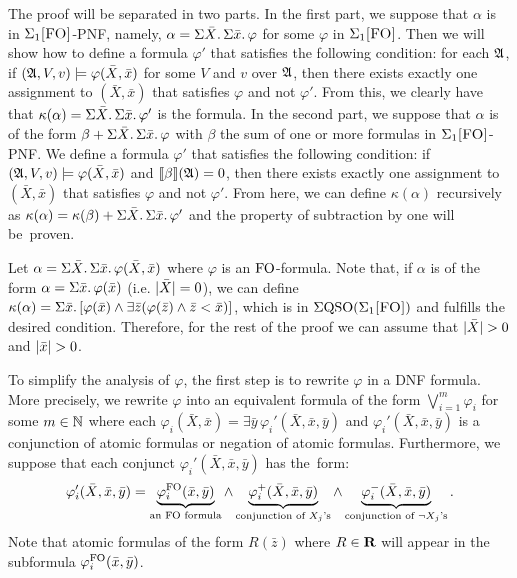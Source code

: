 The proof will be separated in two parts. In the first part, we suppose that  $\alpha$ is in $\Sigma_{1}\textsc{[FO]}$-PNF, namely, $\alpha = \Sigma{\bar{X}}.\,\Sigma{\bar{x}}.\,\varphi$ for some $\varphi$ in $\Sigma_{1}\textsc{[FO]}$. Then we will show how to define a formula $\varphi'$ that satisfies the following condition: for each $\mathfrak{A}$, if $(\mathfrak{A},V,v)\models \varphi(\bar{X},\bar{x})$ for some $V$ and $v$ over $\mathfrak{A}$, then there exists exactly one assignment to $(\bar{X},\bar{x})$ that satisfies $\varphi$ and not $\varphi'$. 
From this, we clearly have that $\kappa(\alpha) = \Sigma{\bar{X}}.\,\Sigma{\bar{x}}.\,\varphi'$ is the formula. In the second part, we suppose that $\alpha$ is of the form $\beta + \Sigma{\bar{X}}.\,\Sigma{\bar{x}}.\,\varphi$ with $\beta$ the sum of one or more formulas in $\Sigma_{1}\textsc{[FO]}$-PNF. 
We define a formula $\varphi'$ that satisfies the following condition: if $(\mathfrak{A},V,v)\models \varphi(\bar{X},\bar{x})$ and ${\llbracket{}{\beta}\rrbracket}(\mathfrak{A}) = 0$, then there exists exactly one assignment to $(\bar{X},\bar{x})$ that satisfies $\varphi$ and not $\varphi'$. From here, we can define $\kappa(\alpha)$ recursively as  $\kappa(\alpha) = \kappa(\beta) +  \Sigma{\bar{X}}.\,\Sigma{\bar{x}}.\,\varphi'$ and the property of subtraction by one will be~proven.

\vspace{1em}

  Let $\alpha =  \Sigma{\bar{X}}.\,\Sigma{\bar{x}}.\, \varphi(\bar{X},\bar{x})$ where $\varphi$ is an  ${\rm FO}$-formula.
Note that, if $\alpha$ is of the form $\alpha = \Sigma{\bar{x}}.\, \varphi(\bar{x})$ (i.e. $\vert \bar{X} \vert = 0$), we can define $\kappa(\alpha) = \Sigma{\bar{x}}.\, [\varphi(\bar{x})\wedge\exists\bar{z}(\varphi(\bar{z})\wedge\bar{z} < \bar{x})]$, which is in $\Sigma{\rm QSO}(\Sigma_{1}\textsc{[FO]})$ and fulfills the desired condition. 
Therefore, for the rest of the proof we can assume that $\vert \bar{X} \vert > 0$ and $\vert \bar{x} \vert > 0$.

To simplify the analysis of $\varphi$, the first step is to rewrite $\varphi$ in a DNF formula. 
More precisely, we rewrite $\varphi$ into an equivalent formula of the form $\bigvee_{i = 1}^m \varphi_i$ for some $m\in \mathbb{N}$ where each $\varphi_i(\bar{X}, \bar{x}) = \exists \bar{y} \, \varphi_i'(\bar{X}, \bar{x}, \bar{y})$ and $\varphi_i'(\bar{X}, \bar{x}, \bar{y})$ is a conjunction of atomic formulas or negation of atomic formulas. Furthermore, we suppose that each conjunct $\varphi_i'(\bar{X}, \bar{x}, \bar{y})$ has the~form:
$$
\varphi_i'(\bar{X}, \bar{x}, \bar{y}) =  \underbrace{\varphi_i^{{\rm FO}}(\bar{x},\bar{y})}_{\text{an ${\rm FO}$ formula}} \wedge 
\underbrace{\varphi_i^{+}(\bar{X},\bar{x},\bar{y})}_{\text{conjunction of $X_j$'s}} \wedge
\underbrace{\varphi_i^{-}(\bar{X},\bar{x},\bar{y})}_{\text{conjunction of $\neg X_j$'s}}.
$$
Note that atomic formulas of the form $R(\bar{z})$ where $R \in \mathbf{R}$ will appear in the subformula $\varphi_i^{{\rm FO}}(\bar{x},\bar{y})$. 

